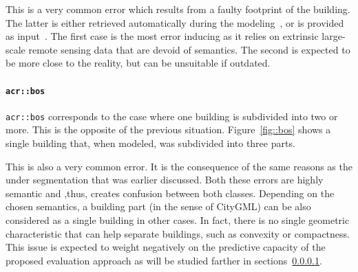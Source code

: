                 This is a very common error which results from a faulty footprint of the building.
                The latter is either retrieved automatically during the modeling~\parencite{lafarge2012creating}, or is provided as input~\parencite{durupt2006automatic}.
                The first case is the most error inducing as it relies on extrinsic large-scale remote sensing data that are devoid of semantics.
                The second is expected to be more close to the reality, but can be unsuitable if outdated.

            \paragraph{\texttt{\acrlong*{acr::bos}}}
                \texttt{\gls{acr::bos}} corresponds to the case where one building is subdivided into two or more.
                This is the opposite of the previous situation.
                Figure~\ref{fig::bos} shows a single building that, when modeled, was subdivided into three parts.\\

                \begin{figure}[H]
                    \centering
                \end{figure}

                This is also a very common error.
                It is the consequence of the same reasons as the under segmentation that was earlier discussed.
                Both these errors are highly semantic and ,thus, creates confusion between both classes.
                Depending on the chosen semantics, a building part (in the sense of CityGML) can be also considered as a single building in other cases.
                In fact, there is no single geometric characteristic that can help separate buildings, such as convexity or compactness.
                This issue is expected to weight negatively on the predictive capacity of the proposed evaluation approach as will be studied farther in sections~\ref{}.

